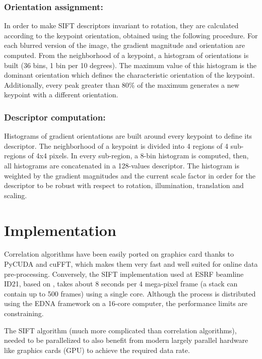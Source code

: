 \documentclass[preprint]{iucr}
\begin{document}
\subsubsection{Orientation assignment:}
In order to make SIFT descriptors invariant to rotation, they are calculated
according to the keypoint orientation,
obtained using the following procedure.
For each blurred version of the image, the gradient magnitude and orientation
are computed.
From the neighborhood of a keypoint, a histogram of orientations is built (36
bins, 1 bin per 10 degrees).
The maximum value of this histogram is the dominant orientation which 
defines the characteristic orientation of the keypoint.
Additionally, every peak greater than 80\% of the maximum generates a new
keypoint with a different orientation.


\subsubsection{Descriptor computation:}
Histograms of gradient orientations are built around every keypoint to define
its descriptor.
The neighborhood of a keypoint is divided into 4 regions of 4 sub-regions of 4x4
pixels.
In every sub-region, a 8-bin histogram is computed, then, all histograms
are concatenated in a 128-values descriptor.
The histogram is weighted by the gradient magnitudes and the current scale
factor in order for the descriptor to be robust with respect to rotation,
illumination, translation and scaling.


\section{Implementation}

Correlation algorithms have been easily ported on
graphics card thanks to PyCUDA \cite{pyopencl} and cuFFT, which makes them very
fast and well suited for online data pre-processing. Conversely, the SIFT
implementation used at ESRF beamline ID21, based on \cite{ASIFT}, takes about 8
seconds per 4 mega-pixel frame  (a stack can contain up to  500 frames) using a
single core. 
Although the process is distributed using the EDNA framework \cite{edna} on a
16-core computer, the performance limits are constraining.

The SIFT algorithm (much more complicated than correlation algorithms), needed
to be parallelized to also benefit from modern largely parallel hardware
like graphics cards (GPU) to achieve the required data rate.
\end{document}

